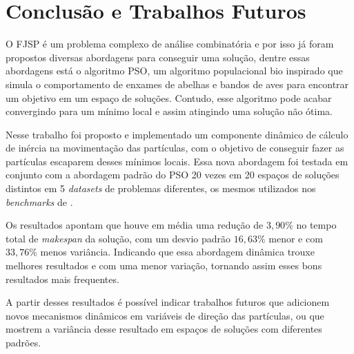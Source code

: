 \chapter{Conclusão e Trabalhos Futuros}

O FJSP é um problema complexo de análise combinatória e por isso já foram propostos diversas abordagens para conseguir uma solução, dentre essas abordagens está o algoritmo PSO, um algoritmo populacional bio inspirado que simula o comportamento de enxames de abelhas e bandos de aves para encontrar um objetivo em um espaço de soluções.
Contudo, esse algoritmo pode acabar convergindo para um mínimo local e assim atingindo uma solução não ótima.


Nesse trabalho foi proposto e implementado um componente dinâmico de cálculo de inércia na movimentação das partículas, com o objetivo de conseguir fazer as partículas escaparem desses mínimos locais. Essa nova abordagem foi testada em conjunto com a abordagem padrão do PSO 20 vezes em 20 espaços de soluções distintos em 5 \textit{datasets} de problemas diferentes, os mesmos utilizados nos \textit{benchmarks} de .


Os resultados apontam que houve em média uma redução de $3,90\%$ no tempo total de \textit{makespan} da solução, com um desvio padrão $16,63\%$ menor e com $33,76\%$ menos variância. Indicando que essa abordagem dinâmica trouxe melhores resultados e com uma menor variação, tornando assim esses bons resultados mais frequentes.


A partir desses resultados é possível indicar trabalhos futuros que adicionem novos mecanismos dinâmicos em variáveis de direção das partículas, ou que mostrem a variância desse resultado em espaços de soluções com diferentes padrões.
